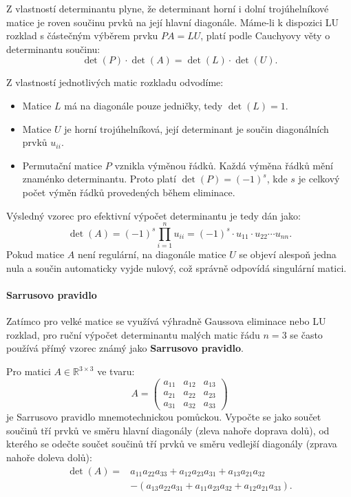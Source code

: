 Z vlastností determinantu plyne, že determinant horní i dolní trojúhelníkové matice je roven součinu prvků na její hlavní diagonále. Máme-li k dispozici LU rozklad s částečným výběrem prvku $PA = LU$, platí podle Cauchyovy věty o determinantu součinu:
\[
\det(P) \cdot \det(A) = \det(L) \cdot \det(U).
\]

Z vlastností jednotlivých matic rozkladu odvodíme:
\begin{itemize}
    \item Matice $L$ má na diagonále pouze jedničky, tedy $\det(L) = 1$.
    \item Matice $U$ je horní trojúhelníková, její determinant je součin diagonálních prvků $u_{ii}$.
    \item Permutační matice $P$ vznikla výměnou řádků. Každá výměna řádků mění znaménko determinantu. Proto platí $\det(P) = (-1)^s$, kde $s$ je celkový počet výměn řádků provedených během eliminace.
\end{itemize}

Výsledný vzorec pro efektivní výpočet determinantu je tedy dán jako:
\[
\det(A) = (-1)^s \prod_{i=1}^n u_{ii} = (-1)^s \cdot u_{11} \cdot u_{22} \cdots u_{nn}.
\]
Pokud matice $A$ není regulární, na diagonále matice $U$ se objeví alespoň jedna nula a součin automaticky vyjde nulový, což správně odpovídá singulární matici.

\paragraph*{Sarrusovo pravidlo}

Zatímco pro velké matice se využívá výhradně Gaussova eliminace nebo LU rozklad, pro ruční výpočet determinantu malých matic řádu $n=3$ se často používá přímý vzorec známý jako \textbf{Sarrusovo pravidlo}. 

Pro matici $A \in \mathbb{R}^{3 \times 3}$ ve tvaru:
\[
A = \begin{pmatrix}
a_{11} & a_{12} & a_{13} \\
a_{21} & a_{22} & a_{23} \\
a_{31} & a_{32} & a_{33}
\end{pmatrix}
\]
je Sarrusovo pravidlo mnemotechnickou pomůckou. Vypočte se jako součet součinů tří prvků ve směru hlavní diagonály (zleva nahoře doprava dolů), od kterého se odečte součet součinů tří prvků ve směru vedlejší diagonály (zprava nahoře doleva dolů):
\[
\begin{split}
\det(A) = {} & a_{11}a_{22}a_{33} + a_{12}a_{23}a_{31} + a_{13}a_{21}a_{32} \\
             & - (a_{13}a_{22}a_{31} + a_{11}a_{23}a_{32} + a_{12}a_{21}a_{33}).
\end{split}
\]

